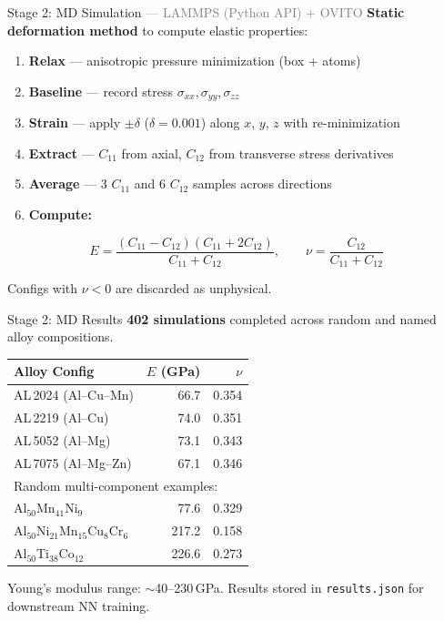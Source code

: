 \begin{frame}{Stage 2: MD Simulation \normalfont\small\textcolor{gray}{--- LAMMPS (Python API) + OVITO}}
\textbf{Static deformation method} to compute elastic properties:

\begin{enumerate}
  \item \textbf{Relax} --- anisotropic pressure minimization (box + atoms)
  \item \textbf{Baseline} --- record stress $\sigma_{xx}, \sigma_{yy}, \sigma_{zz}$
  \item \textbf{Strain} --- apply $\pm\delta$ ($\delta = 0.001$) along $x$, $y$, $z$ with re-minimization
  \item \textbf{Extract} --- $C_{11}$ from axial, $C_{12}$ from transverse stress derivatives
  \item \textbf{Average} --- 3 $C_{11}$ and 6 $C_{12}$ samples across directions
  \item \textbf{Compute:}
\end{enumerate}

\vspace{-0.3em}
\begin{equation*}
  E = \frac{(C_{11} - C_{12})(C_{11} + 2C_{12})}{C_{11} + C_{12}}, \qquad
  \nu = \frac{C_{12}}{C_{11} + C_{12}}
\end{equation*}

\vspace{0.3em}
Configs with $\nu < 0$ are discarded as unphysical.
\end{frame}

\begin{frame}{Stage 2: MD Results}
\textbf{402 simulations} completed across random and named alloy compositions.

\vspace{0.5em}
\centering
\begin{tabular}{lrr}
\toprule
\textbf{Alloy Config} & \textbf{$E$ (GPa)} & \textbf{$\nu$} \\
\midrule
AL\,2024 (Al--Cu--Mn)      & 66.7 & 0.354 \\
AL\,2219 (Al--Cu)           & 74.0 & 0.351 \\
AL\,5052 (Al--Mg)           & 73.1 & 0.343 \\
AL\,7075 (Al--Mg--Zn)      & 67.1 & 0.346 \\
\midrule
\multicolumn{3}{l}{\small Random multi-component examples:} \\
Al$_{50}$Mn$_{41}$Ni$_{9}$     & 77.6 & 0.329 \\
Al$_{50}$Ni$_{21}$Mn$_{15}$Cu$_8$Cr$_6$ & 217.2 & 0.158 \\
Al$_{50}$Ti$_{38}$Co$_{12}$   & 226.6 & 0.273 \\
\bottomrule
\end{tabular}

\vspace{0.5em}
\small Young's modulus range: $\sim$40--230\,GPa. Results stored in \texttt{results.json} for downstream NN training.
\end{frame}
